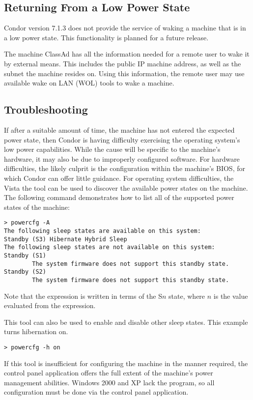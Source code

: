 \subsection{Returning From a Low Power State}

Condor version 7.1.3 does not provide the service of waking a machine
that is in a low power state.
This functionality is planned for a future release.

The machine ClassAd has all the information needed for a remote
user to wake it by external means.
This includes the public IP machine address,
as well as the subnet the machine resides on.
Using this information,
the remote user may use available wake on LAN (WOL) tools 
to wake a machine.

\subsection{Troubleshooting}

If after a suitable amount of time,
the machine has not entered the expected power state,
then Condor is having difficulty exercising the operating system's
low power capabilities.  
While the cause will be specific to the machine's hardware,
it may also be due to improperly configured software.  
For hardware difficulties,
the likely culprit is the configuration within the machine's BIOS,
for which Condor can offer little guidance.
For operating system difficulties,
the Vista the  tool can be used to discover the available 
power states on the machine.
The following command demonstrates how to
list all of the supported power states of the machine:

\begin{verbatim}
> powercfg -A
The following sleep states are available on this system: 
Standby (S3) Hibernate Hybrid Sleep
The following sleep states are not available on this system:
Standby (S1)
        The system firmware does not support this standby state.
Standby (S2)
        The system firmware does not support this standby state.
\end{verbatim}

Note that the  expression is written in terms of the 
S$n$ state, where $n$ is the value evaluated from the expression.

This tool can also be used to enable and disable other sleep states.
This example turns hibernation on.

\begin{verbatim}
> powercfg -h on
\end{verbatim}

If this tool is insufficient for configuring the machine in the manner required,
the  control panel application offers
the full extent of the machine's power management abilities.
Windows 2000 and XP lack the  program,
so all configuration must be done via the 
control panel application.

